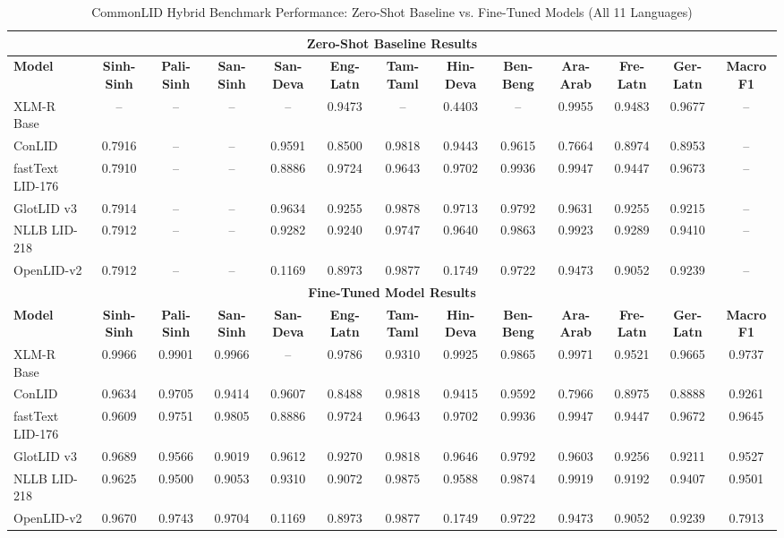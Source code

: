 \documentclass[conference]{IEEEtran}
\begin{document}
\begin{table}[p]
\caption{CommonLID Hybrid Benchmark Performance: Zero-Shot Baseline vs. Fine-Tuned Models (All 11 Languages)}
\label{tab:common_full}
\begin{tabular}{l ccc cccccccc c}
\toprule
\multicolumn{13}{c}{\textbf{Zero-Shot Baseline Results}} \\
\midrule
\textbf{Model} & \textbf{Sinh-Sinh} & \textbf{Pali-Sinh} & \textbf{San-Sinh} & \textbf{San-Deva} & \textbf{Eng-Latn} & \textbf{Tam-Taml} & \textbf{Hin-Deva} & \textbf{Ben-Beng} & \textbf{Ara-Arab} & \textbf{Fre-Latn} & \textbf{Ger-Latn} & \textbf{Macro F1} \\
\midrule
XLM-R Base & -- & -- & -- & -- & 0.9473 & -- & 0.4403 & -- & 0.9955 & 0.9483 & 0.9677 & -- \\
ConLID & 0.7916 & -- & -- & 0.9591 & 0.8500 & 0.9818 & 0.9443 & 0.9615 & 0.7664 & 0.8974 & 0.8953 & -- \\
fastText LID-176 & 0.7910 & -- & -- & 0.8886 & 0.9724 & 0.9643 & 0.9702 & 0.9936 & 0.9947 & 0.9447 & 0.9673 & -- \\
GlotLID v3 & 0.7914 & -- & -- & 0.9634 & 0.9255 & 0.9878 & 0.9713 & 0.9792 & 0.9631 & 0.9255 & 0.9215 & -- \\
NLLB LID-218 & 0.7912 & -- & -- & 0.9282 & 0.9240 & 0.9747 & 0.9640 & 0.9863 & 0.9923 & 0.9289 & 0.9410 & -- \\
OpenLID-v2 & 0.7912 & -- & -- & 0.1169 & 0.8973 & 0.9877 & 0.1749 & 0.9722 & 0.9473 & 0.9052 & 0.9239 & -- \\
\midrule
\multicolumn{13}{c}{\textbf{Fine-Tuned Model Results}} \\
\midrule
\textbf{Model} & \textbf{Sinh-Sinh} & \textbf{Pali-Sinh} & \textbf{San-Sinh} & \textbf{San-Deva} & \textbf{Eng-Latn} & \textbf{Tam-Taml} & \textbf{Hin-Deva} & \textbf{Ben-Beng} & \textbf{Ara-Arab} & \textbf{Fre-Latn} & \textbf{Ger-Latn} & \textbf{Macro F1} \\
\midrule
XLM-R Base & 0.9966 & 0.9901 & 0.9966 & -- & 0.9786 & 0.9310 & 0.9925 & 0.9865 & 0.9971 & 0.9521 & 0.9665 & 0.9737 \\
ConLID & 0.9634 & 0.9705 & 0.9414 & 0.9607 & 0.8488 & 0.9818 & 0.9415 & 0.9592 & 0.7966 & 0.8975 & 0.8888 & 0.9261 \\
fastText LID-176 & 0.9609 & 0.9751 & 0.9805 & 0.8886 & 0.9724 & 0.9643 & 0.9702 & 0.9936 & 0.9947 & 0.9447 & 0.9672 & 0.9645 \\
GlotLID v3 & 0.9689 & 0.9566 & 0.9019 & 0.9612 & 0.9270 & 0.9818 & 0.9646 & 0.9792 & 0.9603 & 0.9256 & 0.9211 & 0.9527 \\
NLLB LID-218 & 0.9625 & 0.9500 & 0.9053 & 0.9310 & 0.9072 & 0.9875 & 0.9588 & 0.9874 & 0.9919 & 0.9192 & 0.9407 & 0.9501 \\
OpenLID-v2 & 0.9670 & 0.9743 & 0.9704 & 0.1169 & 0.8973 & 0.9877 & 0.1749 & 0.9722 & 0.9473 & 0.9052 & 0.9239 & 0.7913 \\
\bottomrule
\end{tabular}


\end{table}
\end{document}

